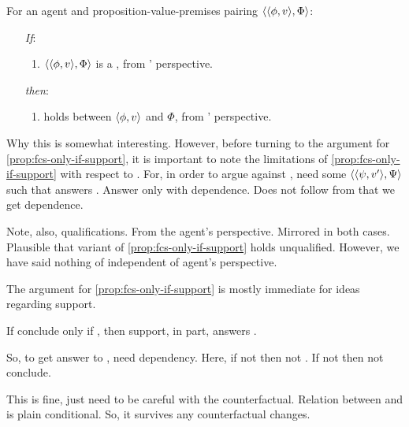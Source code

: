 \begin{note}
  \begin{proposition}
    \label{prop:fcs-only-if-support}
    For an agent \vAgent{} and proposition-value-premises pairing \(\langle \langle \phi, v \rangle, \Phi \rangle\):
    \begin{enumerate}
    \item[\emph{If}:]
      \begin{enumerate}[label=\alph*., ref=(\alph*.)]
      \item
        \(\langle \langle \phi, v \rangle, \Phi \rangle\) is a , from \vAgent{}' perspective.
      \end{enumerate}
    \item[\emph{then}:]
      \begin{enumerate}[label=\alph*., ref=(\alph*.), resume]
      \item
         holds between \(\langle \phi, v \rangle\) and \(\Phi\), from \vAgent{}' perspective.
      \end{enumerate}
    \end{enumerate}
    \vspace{-\baselineskip}
  \end{proposition}

  {
    \color{red}
    Why this is somewhat interesting.
  }
  However, before turning to the argument for \autoref{prop:fcs-only-if-support}, it is important to note the limitations of \autoref{prop:fcs-only-if-support} with respect to \issueConstraint{}.
  For, in order to argue against \issueConstraint{}, need some \(\langle \langle \psi, v' \rangle, \Psi \rangle\) such that answers \qWhyV{}.
  Answer \qWhyV{} only with dependence.
  Does not follow from  that we get dependence.

  Note, also, qualifications.
  From the agent's perspective.
  Mirrored in both cases.
  Plausible that variant of \autoref{prop:fcs-only-if-support} holds unqualified.
  However, we have said nothing of \support{} independent of agent's perspective.
\end{note}

\begin{note}
  The argument for \autoref{prop:fcs-only-if-support} is {\color{red} mostly immediate for ideas regarding support}.

  \begin{goal}
    If conclude only if \fc{}, then support, in part, answers \qWhyV{}.
  \end{goal}

  So, to get answer to \qWhyV{}, need dependency.
  Here, if not \support{} then not \fc{}.
  If not \fc{} then not conclude.

  This is fine, just need to be careful with the counterfactual.
  Relation between \support{} and \fc{} is plain conditional.
  So, it survives any counterfactual changes.
\end{note}

